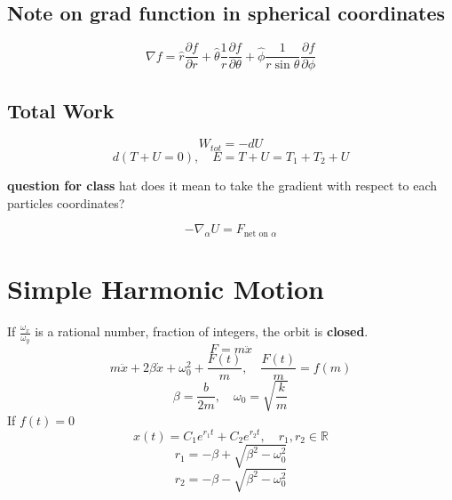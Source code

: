 \subsection{Note on grad function in spherical coordinates}
\begin{equation}
	\label{}
	\nabla f =\hat{r}\frac{\partial{f}}{\partial{r}}+\hat{\theta}\frac{1}{r}\frac{\partial{f}}{\partial{\theta}}+\hat{\phi}\frac{1}{r\sin{\theta}}\frac{\partial{f}}{\partial{\phi}}
\end{equation}

\subsection{Total Work}
\begin{equation}
	\label{}
	W_{tot}=-dU
\end{equation}
\begin{equation}
	\label{}
d(T+U=0),\quad E=T+U=T_{1}+T_{2}+U
\end{equation}

\textbf{question for class } hat does it mean to take the gradient with respect to each particles coordinates?

\begin{equation}
	\label{}
	-\nabla_{\alpha}U=F_{\mbox{net on }\alpha}	
\end{equation}

\section{Simple Harmonic Motion}

If $\frac{\omega_{x}}{\omega_{y}}$ is a rational number, fraction of integers, the orbit is \textbf{closed}.
\begin{equation}
	\label{}
	F=m\ddot{x}
\end{equation}
\begin{equation}
	\label{}
	m\ddot{x}+2\beta\dot{x}+\omega_{0}^{2}+\frac{F(t)}{m},\quad \frac{F(t)}{m}=f(m)
\end{equation}
\begin{equation}
	\label{}
	\beta=\frac{b}{2m},\quad \omega_{0}=\sqrt{\frac{k}{m}} 
\end{equation}
If $f(t)=0$
\begin{equation}
	\label{}
	x(t)=C_{1}e^{r_{1}t}+C_{2}e^{r_{2}t},\quad r_{1},r_{2}\in\mathbb{R}
\end{equation}
\begin{equation}
	\label{}
	r_{1}=-\beta+{\sqrt{\beta^{2}-\omega_{0}^{2}}}
\end{equation}
\begin{equation}
	\label{}	
	r_{2}=-\beta-{\sqrt{\beta^{2}-\omega_{0}^{2}}}
\end{equation}


